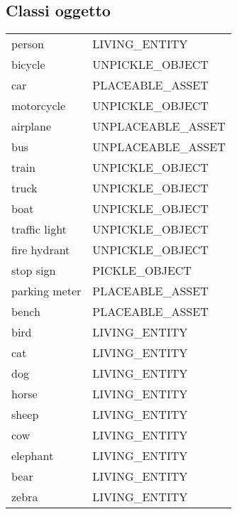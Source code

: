 \subsection{Classi oggetto}\label{appendix:psgtr-classes}
\twocolumn
{}
\tabletail{%
  \hline}
\small
\begin{supertabular}{|l|l|}
  person                & \tiny{LIVING\_ENTITY}     \\
  bicycle               & \tiny{UNPICKLE\_OBJECT  } \\
  car                   & \tiny{PLACEABLE\_ASSET  } \\
  motorcycle            & \tiny{UNPICKLE\_OBJECT  } \\
  airplane              & \tiny{UNPLACEABLE\_ASSET} \\
  bus                   & \tiny{UNPLACEABLE\_ASSET} \\
  train                 & \tiny{UNPICKLE\_OBJECT  } \\
  truck                 & \tiny{UNPICKLE\_OBJECT  } \\
  boat                  & \tiny{UNPICKLE\_OBJECT  } \\
  traffic light         & \tiny{UNPICKLE\_OBJECT  } \\
  fire hydrant          & \tiny{UNPICKLE\_OBJECT  } \\
  stop sign             & \tiny{PICKLE\_OBJECT    } \\
  parking meter         & \tiny{PLACEABLE\_ASSET  } \\
  bench                 & \tiny{PLACEABLE\_ASSET  } \\
  bird                  & \tiny{LIVING\_ENTITY    } \\
  cat                   & \tiny{LIVING\_ENTITY    } \\
  dog                   & \tiny{LIVING\_ENTITY    } \\
  horse                 & \tiny{LIVING\_ENTITY    } \\
  sheep                 & \tiny{LIVING\_ENTITY    } \\
  cow                   & \tiny{LIVING\_ENTITY    } \\
  elephant              & \tiny{LIVING\_ENTITY    } \\
  bear                  & \tiny{LIVING\_ENTITY    } \\
  zebra                 & \tiny{LIVING\_ENTITY    } \\

\end{supertabular}
